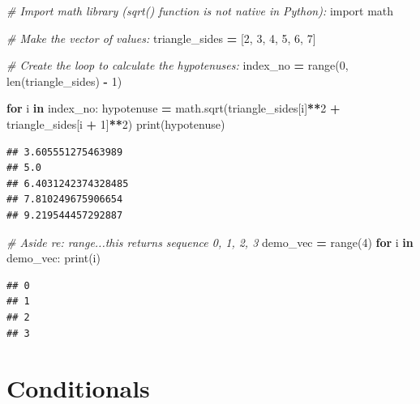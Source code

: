 \documentclass[
]{book}
\newenvironment{Shaded}{\begin{snugshade}}{\end{snugshade}}
\newcommand{\BuiltInTok}[1]{#1}
\newcommand{\CommentTok}[1]{\textcolor[rgb]{0.56,0.35,0.01}{\textit{#1}}}
\newcommand{\ControlFlowTok}[1]{\textcolor[rgb]{0.13,0.29,0.53}{\textbf{#1}}}
\newcommand{\DecValTok}[1]{\textcolor[rgb]{0.00,0.00,0.81}{#1}}
\newcommand{\ImportTok}[1]{#1}
\newcommand{\KeywordTok}[1]{\textcolor[rgb]{0.13,0.29,0.53}{\textbf{#1}}}
\newcommand{\NormalTok}[1]{#1}
\newcommand{\OperatorTok}[1]{\textcolor[rgb]{0.81,0.36,0.00}{\textbf{#1}}}
\begin{document}
\begin{Shaded}
\begin{Highlighting}[]
\CommentTok{\# Import math library (sqrt() function is not native in Python):}
\ImportTok{import}\NormalTok{ math}

\CommentTok{\# Make the vector of values:}
\NormalTok{triangle\_sides }\OperatorTok{=}\NormalTok{ [}\DecValTok{2}\NormalTok{, }\DecValTok{3}\NormalTok{, }\DecValTok{4}\NormalTok{, }\DecValTok{5}\NormalTok{, }\DecValTok{6}\NormalTok{, }\DecValTok{7}\NormalTok{]}

\CommentTok{\# Create the loop to calculate the hypotenuses: }
\NormalTok{index\_no }\OperatorTok{=} \BuiltInTok{range}\NormalTok{(}\DecValTok{0}\NormalTok{, }\BuiltInTok{len}\NormalTok{(triangle\_sides) }\OperatorTok{{-}} \DecValTok{1}\NormalTok{)}

\ControlFlowTok{for}\NormalTok{ i }\KeywordTok{in}\NormalTok{ index\_no:}
\NormalTok{  hypotenuse }\OperatorTok{=}\NormalTok{ math.sqrt(triangle\_sides[i]}\OperatorTok{**}\DecValTok{2} \OperatorTok{+}\NormalTok{ triangle\_sides[i }\OperatorTok{+} \DecValTok{1}\NormalTok{]}\OperatorTok{**}\DecValTok{2}\NormalTok{)}
  \BuiltInTok{print}\NormalTok{(hypotenuse)}
\end{Highlighting}
\end{Shaded}

\begin{verbatim}
## 3.605551275463989
## 5.0
## 6.4031242374328485
## 7.810249675906654
## 9.219544457292887
\end{verbatim}

\begin{Shaded}
\begin{Highlighting}[]
\CommentTok{\# Aside re: range...this returns sequence 0, 1, 2, 3}
\NormalTok{demo\_vec }\OperatorTok{=} \BuiltInTok{range}\NormalTok{(}\DecValTok{4}\NormalTok{)}
\ControlFlowTok{for}\NormalTok{ i }\KeywordTok{in}\NormalTok{ demo\_vec:}
  \BuiltInTok{print}\NormalTok{(i)}
\end{Highlighting}
\end{Shaded}

\begin{verbatim}
## 0
## 1
## 2
## 3
\end{verbatim}

\hypertarget{conditionals}{%
\chapter{Conditionals}\label{conditionals}}
\end{document}

